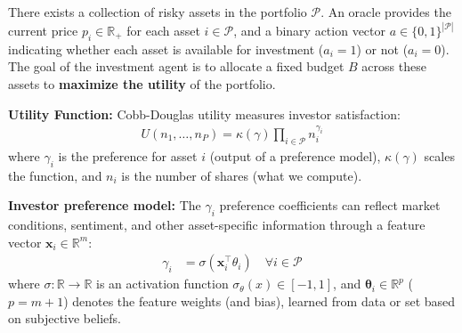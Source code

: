 \documentclass[aspectratio=169]{beamer}
\begin{document}
\begin{frame}
There exists a collection of risky assets in the portfolio $\mathcal{P}$.
An oracle provides the current price $p_{i}\in\mathbb{R}_{+}$ for each asset $i\in\mathcal{P}$, and 
a binary action vector $a\in\{0,1\}^{|\mathcal{P}|}$ indicating whether each asset is available for investment ($a_{i}=1$) or not ($a_{i}=0$).
The goal of the investment agent is to allocate a fixed budget $B$ across these assets to \textbf{maximize the utility} of the portfolio. 
\end{frame}

\begin{frame}
\textbf{Utility Function:} Cobb-Douglas utility measures investor satisfaction:
\begin{align*}
U(n_1, \dots, n_P) = \kappa(\gamma) \prod_{i \in \mathcal{P}} n_i^{\gamma_i}
\end{align*}
where $\gamma_i$ is the preference for asset $i$ (output of a preference model), $\kappa(\gamma)$ scales the function, and $n_i$ is the number of shares (what we compute).
\end{frame}

\begin{frame}
\textbf{Investor preference model:} The $\gamma_{i}$ preference coefficients can reflect market conditions, sentiment, and other asset-specific information through a feature vector $\mathbf{x}_{i}\in\mathbb{R}^{m}$:
\begin{align*}
\gamma_{i} & = \sigma\left(\mathbf{x}^{\top}_{i}\theta_{i}\right)\quad\forall{i}\in\mathcal{P}
\end{align*}
where $\sigma:\mathbb{R}\rightarrow\mathbb{R}$ is an activation function $\sigma_{\theta}(x)\in[-1,1]$,
and $\mathbf{\theta}_{i}\in\mathbb{R}^{p}$ ($p=m+1$) denotes the feature weights (and bias), learned from data or set based on subjective beliefs.
\end{frame}
\end{document}
